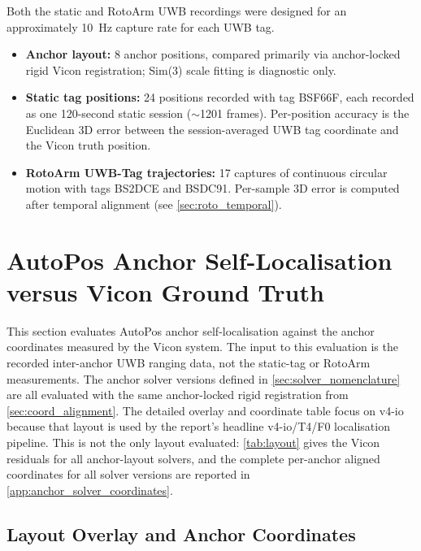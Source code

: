 \documentclass[11pt,a4paper]{article}
\begin{document}
\vspace{0.4em}
Both the static and RotoArm UWB recordings were designed for an approximately 10~Hz capture rate for each UWB tag.
\begin{itemize}[topsep=4pt,itemsep=4pt]
\item \textbf{Anchor layout:} 8 anchor positions, compared primarily via anchor-locked rigid Vicon registration; Sim(3) scale fitting is diagnostic only.
  \item \textbf{Static tag positions:} 24 positions recorded with tag BSF66F, each recorded as one 120-second static session ($\sim$1201 frames).
        Per-position accuracy is the Euclidean 3D error between the session-averaged UWB tag coordinate and the Vicon truth position.
  \item \textbf{RotoArm UWB-Tag trajectories:} 17 captures of continuous circular motion with tags BS2DCE and BSDC91.
        Per-sample 3D error is computed after temporal alignment (see \cref{sec:roto_temporal}).
\end{itemize}


\newpage
\section{AutoPos Anchor Self-Localisation versus Vicon Ground Truth}
\label{sec:anchor}

This section evaluates AutoPos anchor self-localisation against the anchor coordinates measured by the Vicon system.
The input to this evaluation is the recorded inter-anchor UWB ranging data, not the static-tag or RotoArm measurements.
The anchor solver versions defined in \cref{sec:solver_nomenclature} are all evaluated with the same anchor-locked rigid registration from \cref{sec:coord_alignment}.
The detailed overlay and coordinate table focus on v4-io because that layout is used by the report's headline v4-io/T4/F0 localisation pipeline.
This is not the only layout evaluated: \cref{tab:layout} gives the Vicon residuals for all anchor-layout solvers, and the complete per-anchor aligned coordinates for all solver versions are reported in \cref{app:anchor_solver_coordinates}.

\subsection{Layout Overlay and Anchor Coordinates}
\end{document}
